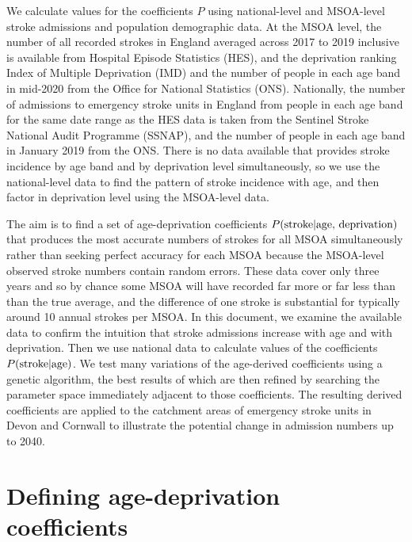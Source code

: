 \documentclass[12pt]{extarticle}
\begin{document}
We calculate values for the coefficients $P$ using national-level and MSOA-level stroke admissions and population demographic data.
%
At the MSOA level, the number of all recorded strokes in England averaged across 2017 to 2019 inclusive is available from Hospital Episode Statistics (HES),
and the deprivation ranking Index of Multiple Deprivation (IMD) and the number of people in each age band in mid-2020 from the Office for National Statistics (ONS).
Nationally, the number of admissions to emergency stroke units in England from people in each age band for the same date range as the HES data is taken from the Sentinel Stroke National Audit Programme (SSNAP),
and the number of people in each age band in January 2019 from the ONS.
% 
There is no data available that provides stroke incidence by age band and by deprivation level simultaneously,
so we use the national-level data to find the pattern of stroke incidence with age,
and then factor in deprivation level using the MSOA-level data.

The aim is to find a set of age-deprivation coefficients $P(\textnormal{stroke} | \textnormal{age, deprivation})$ that produces the most accurate numbers of strokes for all MSOA simultaneously rather than seeking perfect accuracy for each MSOA
because the MSOA-level observed stroke numbers contain random errors.
These data cover only three years and so by chance some MSOA will have recorded far more or far less than than the true average,
and the difference of one stroke is substantial for typically around 10 annual strokes per MSOA.
%
In this document,
we examine the available data to confirm the intuition that stroke admissions increase with age and with deprivation.
Then we use national data to calculate values of the coefficients $P(\textnormal{stroke} | \textnormal{age})$.
We test many variations of the age-derived coefficients using a genetic algorithm,
the best results of which are then refined by searching the parameter space immediately adjacent to those coefficients.
% 
The resulting derived coefficients are applied to the catchment areas of emergency stroke units in Devon and Cornwall to illustrate the potential change in admission numbers up to 2040.


\section{Defining age-deprivation coefficients}
\end{document}
